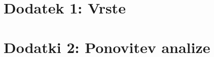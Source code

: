 \documentclass{article}
\begin{document}
\begin{multicols}{2}
\section{Dodatek 1: Vrste}



\section{Dodatki 2: Ponovitev analize}



\end{multicols}
\end{document}
